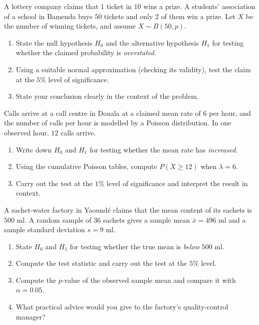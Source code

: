 \documentclass[11pt]{article}
\newcounter{popsec}
\newcounter{popsub}
\newcommand{\courssub}[1]{%
  \stepcounter{popsub}%
  \par\vspace{9pt}\noindent{\popxbold\fontsize{11.5}{13}\selectfont\color{popink}{\color{poporange}\thepopsec.\thepopsub}\hspace{6pt}#1}\par\nopagebreak\vspace{4pt}
}
\begin{document}
\courssub{I practise}

\begin{exercice}
A lottery company claims that $1$ ticket in $10$ wins a prize. A students' association of a school in Bamenda buys $50$ tickets and only $2$ of them win a prize. Let $X$ be the number of winning tickets, and assume $X \sim B(50, p)$.
\begin{enumerate}
\item State the null hypothesis $H_0$ and the alternative hypothesis $H_1$ for testing whether the claimed probability is \emph{overstated}.
\item Using a suitable normal approximation (checking its validity), test the claim at the $5\%$ level of significance.
\item State your conclusion clearly in the context of the problem.
\end{enumerate}
\end{exercice}

\begin{exercice}
Calls arrive at a call centre in Douala at a claimed mean rate of $6$ per hour, and the number of calls per hour is modelled by a Poisson distribution. In one observed hour, $12$ calls arrive.
\begin{enumerate}
\item Write down $H_0$ and $H_1$ for testing whether the mean rate has \emph{increased}.
\item Using the cumulative Poisson tables, compute $P(X \geq 12)$ when $\lambda = 6$.
\item Carry out the test at the $1\%$ level of significance and interpret the result in context.
\end{enumerate}
\end{exercice}

\begin{exercice}
A sachet-water factory in Yaoundé claims that the mean content of its sachets is $500$ ml. A random sample of $36$ sachets gives a sample mean $\bar{x} = 496$ ml and a sample standard deviation $s = 9$ ml.
\begin{enumerate}
\item State $H_0$ and $H_1$ for testing whether the true mean is \emph{below} $500$ ml.
\item Compute the test statistic and carry out the test at the $5\%$ level.
\item Compute the $p$-value of the observed sample mean and compare it with $\alpha = 0.05$.
\item What practical advice would you give to the factory's quality-control manager?
\end{enumerate}
\end{exercice}
\end{document}
